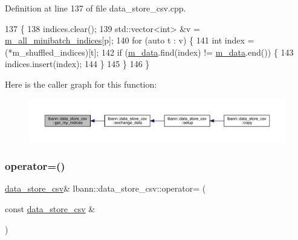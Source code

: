 Definition at line 137 of file data\+\_\+store\+\_\+csv.\+cpp.


\begin{DoxyCode}
137                                                                          \{
138   indices.clear();
139   std::vector<int> &v = \hyperlink{classlbann_1_1generic__data__store_afd21d4f029e450328f8703dd72702e73}{m\_all\_minibatch\_indices}[p];
140   \textcolor{keywordflow}{for} (\textcolor{keyword}{auto} t : v) \{
141     \textcolor{keywordtype}{int} index = (*m\_shuffled\_indices)[t];
142     \textcolor{keywordflow}{if} (\hyperlink{classlbann_1_1data__store__csv_a8f0ac398b2ed53c36594ca1baaf4bde0}{m\_data}.find(index) != \hyperlink{classlbann_1_1data__store__csv_a8f0ac398b2ed53c36594ca1baaf4bde0}{m\_data}.end()) \{
143       indices.insert(index);
144     \}
145   \}
146 \}
\end{DoxyCode}
Here is the caller graph for this function\+:\nopagebreak
\begin{figure}[H]
\begin{center}
\leavevmode
\includegraphics[width=350pt]{classlbann_1_1data__store__csv_ab0ebfe735a732205f7f3c66c876e20b9_icgraph}
\end{center}
\end{figure}
\mbox{\label{classlbann_1_1data__store__csv_a9a8cadac9ca32ad0da758bfdd2112755}} 
\subsubsection{\texorpdfstring{operator=()}{operator=()}}
{\footnotesize\ttfamily \hyperlink{classlbann_1_1data__store__csv}{data\+\_\+store\+\_\+csv}\& lbann\+::data\+\_\+store\+\_\+csv\+::operator= (\begin{DoxyParamCaption}\item[{const \hyperlink{classlbann_1_1data__store__csv}{data\+\_\+store\+\_\+csv} \&}]{ }\end{DoxyParamCaption})\hspace{0.3cm}{\ttfamily [default]}}



